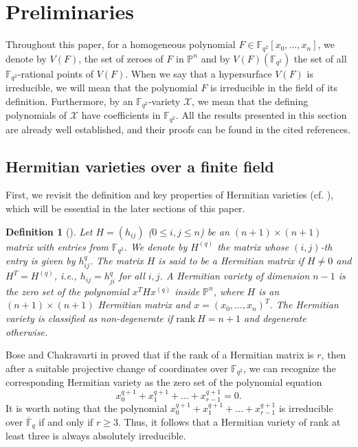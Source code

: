 \documentclass[10pt,a4paper,oneside]{amsproc}
\newtheorem{definition}[theorem]{Definition}
\newcommand{\Fqt}{\mathbb{F}_{q^2}}
\def\FF{{\mathbb F}}
\def\PP{{\mathbb P}}
\newcommand{\X}{\mathcal{X}}
\begin{document}
\section{Preliminaries}\label{prel}

Throughout this paper, for a homogeneous polynomial $F \in \Fqt[x_0, \dots , x_n]$, we denote by $V(F)$, the set of zeroes of $F$ in $\PP^n$ and by $V(F)(\Fqt)$ the set of all $\Fqt$-rational points of $V(F)$. When we say that a hypersurface $V(F)$ is irreducible, we will mean that the polynomial $F$ is irreducible in the field of its definition. Furthermore, by an $\Fqt$-variety $\X$, we mean that the defining polynomials of $\X$ have coefficients in $\Fqt$.
All the results presented in this section are already well established, and their proofs can be found in the cited references.


\subsection{Hermitian varieties over a finite field}\label{Geometry of Hermitian}
First, we revisit the definition and key properties of Hermitian varieties (cf. \cite{BC, C}), which will be essential in the later sections of this paper.

\begin{definition}[\cite{BC}] \normalfont
Let $H = (h_{ij})$ ($0 \le i, j \le n$) be an $(n+1) \times (n+1)$ matrix with entries from $\Fqt$. We denote by $H^{(q)}$ the matrix whose $(i, j)$-th entry is given by $h_{ij}^q$. The matrix $H$ is said to be a \textit{Hermitian matrix} if $H \neq 0$ and $H^T = H^{(q)}$, i.e., $h_{ij}=h_{ji}^q$ for all $i,j$. A \textit{Hermitian variety} of dimension $n-1$ is the zero set of the polynomial $x^T H x^{(q)}$ inside $\PP^n$, where $H$ is an $(n+1) \times (n+1)$ Hermitian matrix and $x = (x_0, \dots, x_n)^T$. The Hermitian variety is classified as \textit{non-degenerate} if $\mathrm{rank} \ H = n+1$ and \textit{degenerate} otherwise.
\end{definition}

Bose and Chakravarti in \cite[Corollary of Theorem 4.1]{BC} proved that if the rank of a Hermitian matrix is $r$, then after a suitable projective change of coordinates over $\Fqt$, we can recognize the corresponding Hermitian variety as the zero set of the polynomial equation
\begin{equation}\label{reduceherm}
x_0^{q+1} + x_1^{q+1} + \dots + x_{r-1}^{q+1} = 0.
\end{equation}
It is worth noting that the polynomial $x_0^{q+1} + x_1^{q+1} + \dots + x_{r-1}^{q+1}$ is irreducible over $\overline{\FF}_q$ if and only if $r\geq 3$. Thus, it follows that a Hermitian variety of rank at least three is always absolutely irreducible. 
\end{document}
